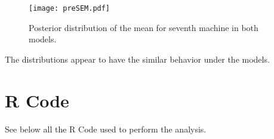 \documentclass[a4paper, 11pt]{article}
\begin{document}
\begin{figure}[H]
\centering
\caption{Posterior distribution of the mean for seventh machine in both models.}
\label{Fig3}
\texttt{[image: preSEM.pdf]}
\end{figure}

The distributions appear to have the similar behavior under the models.


\newpage
\section*{R Code}

See below all the R Code used to perform the analysis.
\end{document}

